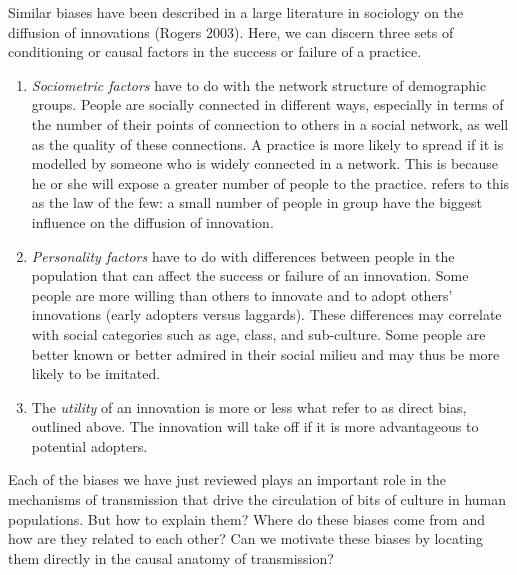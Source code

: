 Similar biases have been described in a large literature in sociology on 
the diffusion of innovations (Rogers 2003). Here, we can discern three 
sets of conditioning or causal factors in the success or failure of a 
practice. 

\begin{enumerate}
\item \textit{Sociometric factors} have to do with the network structure of 
demographic groups. People are socially 
connected in different ways, especially in terms of the number of their points of 
connection to others in a social network, as well as the quality of these connections. A practice is more likely to spread if 
it is modelled by someone who is widely connected in a network. This is because he or she will expose a greater number of people to the 
practice. \citet{gladwell_tipping_2000} refers to this as the law of the few: a small number of people in group have the biggest influence on the diffusion of innovation. 



\item \textit{Personality factors} have to do with differences between 
people in the population that can affect the success 
or failure of an innovation. Some people are more willing than others to 
innovate and to adopt others' innovations (early adopters versus 
laggards). These differences may correlate with social categories 
such as age, class, and sub-culture. Some people are better known or 
better admired in their social milieu and may thus be more likely to be 
imitated. 



\item The \textit{utility} of an innovation is more or 
less what \citet{boyd_culture_1985} refer to as direct bias,  outlined 
above. The innovation will take off if it is more advantageous to 
potential adopters. 
\end{enumerate}



Each of the biases we have just reviewed plays an important 
role in the mechanisms of transmission that drive the circulation of 
bits of culture in human populations. But how to explain them? Where do 
these biases come from and how are they related to each other? Can we motivate these biases by 
locating them directly in the causal anatomy of transmission?  


